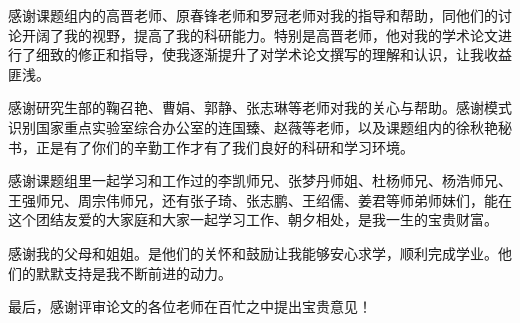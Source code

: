 感谢课题组内的高晋老师、原春锋老师和罗冠老师对我的指导和帮助，同他们的讨论开阔了我的视野，提高了我的科研能力。特别是高晋老师，他对我的学术论文进行了细致的修正和指导，使我逐渐提升了对学术论文撰写的理解和认识，让我收益匪浅。




感谢研究生部的鞠召艳、曹娟、郭静、张志琳等老师对我的关心与帮助。感谢模式识别国家重点实验室综合办公室的连国臻、赵薇等老师，以及课题组内的徐秋艳秘书，正是有了你们的辛勤工作才有了我们良好的科研和学习环境。

感谢课题组里一起学习和工作过的李凯师兄、张梦丹师姐、杜杨师兄、杨浩师兄、王强师兄、周宗伟师兄，还有张子琦、张志鹏、王绍儒、姜君等师弟师妹们，能在这个团结友爱的大家庭和大家一起学习工作、朝夕相处，是我一生的宝贵财富。

感谢我的父母和姐姐。是他们的关怀和鼓励让我能够安心求学，顺利完成学业。他们的默默支持是我不断前进的动力。

最后，感谢评审论文的各位老师在百忙之中提出宝贵意见！

\vspace{8mm}

\cleardoublepage[plain]%
